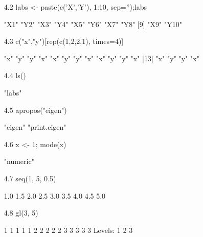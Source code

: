 \documentclass[letterpaper, 12pt]{article}
\begin{document}
\begin{enumerate}
\begin{enumerate}
\item[4.2] labs <- paste(c('X','Y'), 1:10, sep='');labs

\begin{Schunk}
\begin{Soutput}
 [1] "X1"  "Y2"  "X3"  "Y4"  "X5"  "Y6"  "X7"  "Y8" 
 [9] "X9"  "Y10"
\end{Soutput}
\end{Schunk}

\item[4.3] c("x","y")[rep(c(1,2,2,1), times=4)]

\begin{Schunk}
\begin{Soutput}
 [1] "x" "y" "y" "x" "x" "y" "y" "x" "x" "y" "y" "x"
[13] "x" "y" "y" "x"
\end{Soutput}
\end{Schunk}

\item[4.4] ls()

\begin{Schunk}
\begin{Soutput}
[1] "labs"
\end{Soutput}
\end{Schunk}

\item[4.5] apropos("eigen")

\begin{Schunk}
\begin{Soutput}
[1] "eigen"       "print.eigen"
\end{Soutput}
\end{Schunk}

\item[4.6] x <- 1; mode(x)
\begin{Schunk}
\begin{Soutput}
[1] "numeric"
\end{Soutput}
\end{Schunk}

\item[4.7] seq(1, 5, 0.5)
\begin{Schunk}
\begin{Soutput}
[1] 1.0 1.5 2.0 2.5 3.0 3.5 4.0 4.5 5.0
\end{Soutput}
\end{Schunk}

\item[4.8] gl(3, 5)
\begin{Schunk}
\begin{Soutput}
 [1] 1 1 1 1 1 2 2 2 2 2 3 3 3 3 3
Levels: 1 2 3
\end{Soutput}
\end{Schunk}


\end{enumerate}
\end{enumerate}
\end{document}
